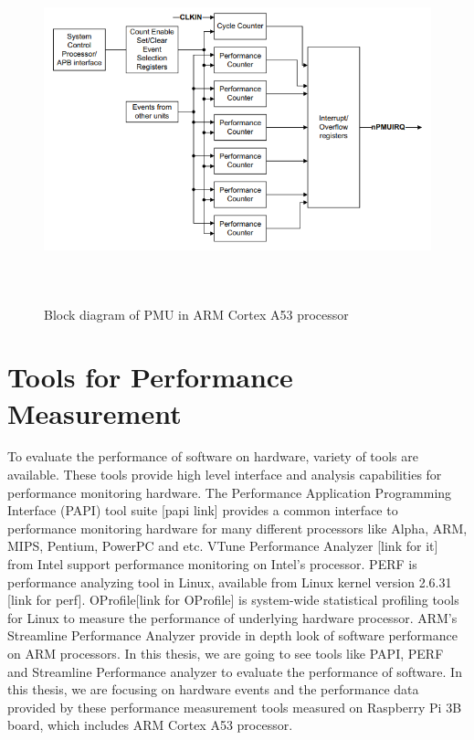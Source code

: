 \begin{figure}[h!]
\includegraphics[width=14cm, height=10cm]{./images/pmu}
\centering
\caption{Block diagram of PMU in ARM Cortex A53 processor}
\label{fig:pmu}
\end{figure}

\section{Tools for Performance Measurement}
To evaluate the performance of software on hardware, variety of tools are available. These tools provide high level interface and analysis capabilities for performance monitoring hardware. The Performance Application Programming Interface (PAPI) tool suite [papi link] provides a common interface to performance monitoring hardware for many different processors like Alpha, ARM, MIPS, Pentium, PowerPC and etc. VTune Performance Analyzer [link for it] from Intel support performance monitoring on Intel's processor. PERF is performance analyzing tool in Linux, available from Linux kernel version 2.6.31 [link for perf]. OProfile[link for OProfile] is system-wide  statistical profiling tools for Linux to measure the performance of underlying hardware processor. ARM's Streamline Performance Analyzer provide in depth look of software performance on ARM processors. In this thesis, we are going to see tools like PAPI, PERF and Streamline Performance analyzer to evaluate the performance of software. In this thesis, we are focusing on hardware events and the performance data provided by these performance measurement tools measured on Raspberry Pi 3B board, which includes ARM Cortex A53 processor.

